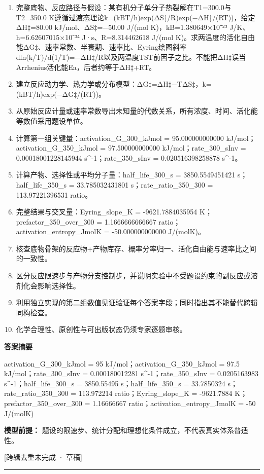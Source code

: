 \documentclass[UTF8,11pt,a4paper]{ctexart}
\begin{document}
\begin{enumerate}
\item 完整底物、反应路径与假设：某有机分子单分子热裂解在T1=300.0与T2=350.0 K遵循过渡态理论k=(kBT/h)exp(ΔS‡/R)exp(−ΔH‡/(RT))，给定ΔH‡=80.00 kJ/mol、ΔS‡=−50.00 J/(mol K)，kB=1.380649×10⁻²³ J/K、h=6.62607015×10⁻³⁴ J·s、R=8.314462618 J/(mol K)。求两温度的活化自由能ΔG‡、速率常数、半衰期、速率比、Eyring绘图斜率dln(k/T)/d(1/T)=−ΔH‡/R以及两温度TST前因子之比。不能把ΔH‡误当Arrhenius活化能Ea，后者约等于ΔH‡+RT。
\item 建立反应动力学、热力学或分布模型：ΔG‡=ΔH‡−TΔS‡，k=(kBT/h)exp(−ΔG‡/(RT))。
\item 从原始反应计量或速率常数导出未知量的代数关系，所有浓度、时间、活化能等数值采用题设单位。
\item 计算第一组关键量：activation\_G\_300\_kJmol = 95.000000000000 kJ/mol；activation\_G\_350\_kJmol = 97.500000000000 kJ/mol；rate\_300\_sInv = 0.00018001228145944 s\textasciicircum{}-1；rate\_350\_sInv = 0.020516398258878 s\textasciicircum{}-1。
\item 计算产物、选择性或平均分子量：half\_life\_300\_s = 3850.5549451421 s；half\_life\_350\_s = 33.785032431801 s；rate\_ratio\_350\_300 = 113.97221396531 ratio。
\item 完整结果与交叉量：Eyring\_slope\_K = -9621.7884035954 K；prefactor\_350\_over\_300 = 1.1666666666667 ratio；activation\_entropy\_JmolK = -50.000000000000 J/(molK)。
\item 核查底物骨架的反应物+产物库存、概率分率归一、活化自由能与速率比之间的一致性。
\item 区分反应限速步与产物分支控制步，并说明实验中不受题设约束的副反应或溶剂化会影响选择性。
\item 利用独立实现的第二组数值见证验证每个答案字段；同时指出其不能替代跨辑同构检查。
\item 化学合理性、原创性与可出版状态仍须专家逐题审核。
\end{enumerate}
\noindent\textbf{答案摘要}\par
activation\_G\_300\_kJmol = 95 kJ/mol；activation\_G\_350\_kJmol = 97.5 kJ/mol；rate\_300\_sInv = 0.000180012281 s\textasciicircum{}-1；rate\_350\_sInv = 0.0205163983 s\textasciicircum{}-1；half\_life\_300\_s = 3850.55495 s；half\_life\_350\_s = 33.7850324 s；rate\_ratio\_350\_300 = 113.972214 ratio；Eyring\_slope\_K = -9621.7884 K；prefactor\_350\_over\_300 = 1.16666667 ratio；activation\_entropy\_JmolK = -50 J/(molK)\par
\noindent\textbf{模型前提：}
题设的限速步、统计分配和理想化条件成立，不代表真实体系普适性。\par
\noindent\textcolor{red!65!black}{[跨辑去重未完成 · 草稿]} \par
\medskip\hrule\medskip
{}
\end{document}
